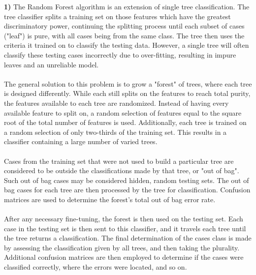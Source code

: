 \documentclass{homework}
\begin{document}
\textbf{1)} The Random Forest algorithm is an extension of single tree classification. The tree classifier splits a training set on those features which have the greatest discriminatory power, continuing the splitting process until each subset of cases ("leaf") is pure, with all cases being from the same class. The tree then uses the criteria it trained on to classify the testing data. However, a single tree will often classify these testing cases incorrectly due to over-fitting, resulting in impure leaves and an unreliable model.\\\\ 
The general solution to this problem is to grow a "forest" of trees, where each tree is designed differently. While each still splits on the features to reach total purity, the features available to each tree are randomized. Instead of having every available feature to split on, a random selection of features equal to the square root of the total number of features is used. Additionally, each tree is trained on a random selection of only two-thirds of the training set. This results in a classifier containing a large number of varied trees.\\\\
Cases from the training set that were not used to build a particular tree are considered to be outside the classifications made by that tree, or "out of bag". Such out of bag cases may be considered hidden, random testing sets. The out of bag cases for each tree are then processed by the tree for classification. Confusion matrices are used to determine the forest's total out of bag error rate.\\\\ 
After any necessary fine-tuning, the forest is then used on the testing set. Each case in the testing set is then sent to this classifier, and it travels each tree until the tree returns a classification. The final determination of the cases class is made by assessing the classification given by all trees, and then taking the plurality. Additional confusion matrices are then employed to determine if the cases were classified correctly, where the errors were located, and so on.
\end{document}
